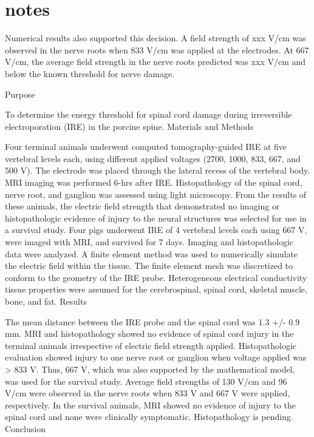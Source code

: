\documentclass{article}
\begin{document}
\section{notes}








Numerical results also supported this decision. A field strength of xxx
V/cm was observed in the nerve roots when 833 V/cm was applied at the
electrodes. At 667 V/cm, the average field strength in the nerve roots
predicted was xxx V/cm and below the known threshold for nerve damage. 


Purpose

To determine the energy threshold for spinal cord damage during irreversible
electroporation (IRE) in the porcine spine.
Materials and Methods

Four terminal animals underwent computed tomography-guided IRE at five
vertebral levels each, using different applied voltages (2700, 1000, 833,
667, and 500 V). The electrode was placed through the lateral recess of the
vertebral body. MRI imaging was performed 6-hrs after IRE. Histopathology of
the spinal cord, nerve root, and ganglion was assessed using light
microscopy. From the results of these animals, the electric field strength
that demonstrated no imaging or histopathologic evidence of injury to the
neural structures was selected for use in a survival study. Four pigs
underwent IRE of 4 vertebral levels each using 667 V, were imaged with MRI,
and survived for 7 days. Imaging and histopathologic data were analyzed. A
finite element method was used to numerically simulate the electric field
within the tissue. The finite element mesh was discretized to conform to the
geometry of the IRE probe. Heterogeneous electrical conductivity tissue
properties were assumed for the cerebrospinal, spinal cord, skeletal muscle,
bone, and fat.
Results

The mean distance between the IRE probe and the spinal cord was 1.3 +/- 0.9
mm. MRI and histopathology showed no evidence of spinal cord injury in the
terminal animals irrespective of electric field strength applied.
Histopathologic evaluation showed injury to one nerve root or ganglion when
voltage applied was > 833 V. Thus, 667 V, which was also supported by the
mathematical model, was used for the survival study. Average field strengths
of 130 V/cm and 96 V/cm were observed in the nerve roots when 833 V and 667
V were applied, respectively. In the survival animals, MRI showed no
evidence of injury to the spinal cord and none were clinically symptomatic.
Histopathology is pending.
Conclusion
\end{document}
